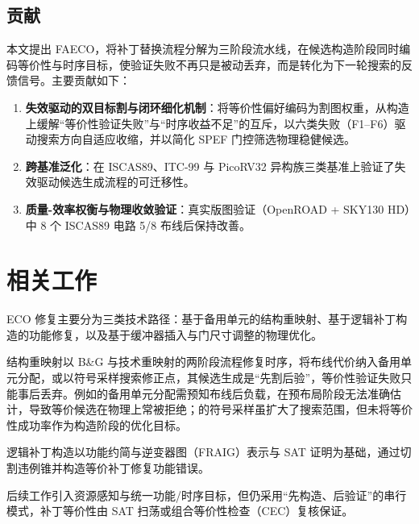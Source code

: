 \documentclass[journal]{IEEEtran}
\begin{document}
\subsection{贡献}

本文提出 FAECO，将补丁替换流程分解为三阶段流水线，在候选构造阶段同时编码等价性与时序目标，使验证失败不再只是被动丢弃，而是转化为下一轮搜索的反馈信号。主要贡献如下：

\begin{enumerate}
  \item \textbf{失效驱动的双目标割与闭环细化机制}：将等价性偏好编码为割图权重，从构造上缓解“等价性验证失败”与“时序收益不足”的互斥，以六类失败（F1--F6）驱动搜索方向自适应收缩，并以简化 SPEF 门控筛选物理稳健候选。
  \item \textbf{跨基准泛化}：在 ISCAS89、ITC-99 与 PicoRV32 异构族三类基准上验证了失效驱动候选生成流程的可迁移性。
  \item \textbf{质量-效率权衡与物理收敛验证}：真实版图验证（OpenROAD + SKY130 HD）中 8 个 ISCAS89 电路 5/8 布线后保持改善。
\end{enumerate}

\section{相关工作}

ECO 修复主要分为三类技术路径：基于备用单元的结构重映射、基于逻辑补丁构造的功能修复，以及基于缓冲器插入与门尺寸调整的物理优化。

结构重映射以 B\&G 与技术重映射的两阶段流程修复时序，将布线代价纳入备用单元分配\cite{ho2010eco,ho2012treco}，或以符号采样搜索修正点\cite{kravets2019symbolic}，其候选生成是“先割后验”，等价性验证失败只能事后丢弃。例如\cite{ho2010eco}的备用单元分配需预知布线后负载，在预布局阶段无法准确估计，导致等价候选在物理上常被拒绝；\cite{kravets2019symbolic}的符号采样虽扩大了搜索范围，但未将等价性成功率作为构造阶段的优化目标。

逻辑补丁构造以功能约简与逆变器图（FRAIG）表示与 SAT 证明为基础，通过切割违例锥并构造等价补丁修复功能错误\cite{jiang2010fraig,jiang2016resource}。

后续工作引入资源感知\cite{jiang2016resource}与统一功能/时序目标\cite{lin2011simult,luo2016unified}，但仍采用“先构造、后验证”的串行模式，补丁等价性由 SAT 扫荡或组合等价性检查（CEC）复核保证\cite{mishchenko2006sat,zhong2024stp}。
\end{document}

